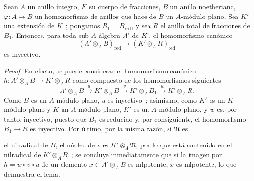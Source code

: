 \begin{lemma}[23.2.3]
\label{0.23.2.3-es}
Sean $A$ un anillo íntegro, $K$ su cuerpo de fracciones, $B$ un anillo
noetheriano, $\varphi:A\to B$ un homomorfismo de anillos que hace de $B$ un
$A$-módulo plano. Sea $K'$ una extensión de $K$~; pongamos
$B_1=B_{\mathrm{red}}$, y sea $R$ el anillo total de fracciones de $B_1$.
Entonces, para toda sub-$A$-álgebra $A'$ de $K'$, el homomorfismo canónico
\begin{equation}
\label{0.23.1.8.1-es}
  (A'\otimes_AB)_{\mathrm{red}}
  \longrightarrow(K'\otimes_AR)_{\mathrm{red}}
  \tag{23.1.8.1}
\end{equation}
es inyectivo.
\end{lemma}

\begin{proof}
En efecto, se puede considerar el homomorfismo canónico
$h:A'\otimes_AB\to K'\otimes_AR$ como compuesto de los homomorfismos siguientes
\[
  A'\otimes_AB\xrightarrow{u}K'\otimes_AB
  \xrightarrow{v}K'\otimes_AB_1\xrightarrow{w}K'\otimes_AR.
\]
Como $B$ es un $A$-módulo plano, $u$ es inyectivo~; asimismo, como $K'$ es un
$K$-módulo plano y $K$ un $A$-módulo plano, $K'$ es un $A$-módulo plano, y
$w$ es, por tanto, inyectivo, puesto que $B_1$ es reducido y, por consiguiente, el homomorfismo
$B_1\to R$ es inyectivo. Por último, por la misma razón, si $\mathfrak N$ es


el nilradical de $B$, el núcleo de $v$ es $K'\otimes_A\mathfrak N$, por lo que está
contenido en el nilradical de $K'\otimes_AB$~; se concluye inmediatamente que si
la imagen por $h=w\circ v\circ u$ de un elemento $x\in A'\otimes_AB$ es
nilpotente, $x$ es nilpotente, lo que demuestra el lema.
\end{proof}

